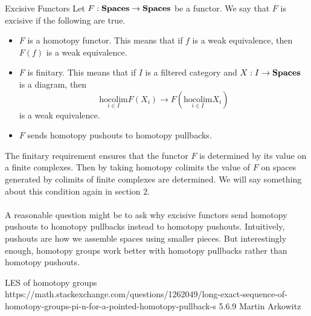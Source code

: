 \documentclass[a4paper]{article}
\begin{document}
\begin{defn}{Excisive Functors}{} Let $F:\bold{Spaces}\to\bold{Spaces}$ be a functor. We say that $F$ is excisive if the following are true. 
\begin{itemize}
\item $F$ is a homotopy functor. This means that if $f$ is a weak equivalence, then $F(f)$ is a weak equivalence. 
\item $F$ is finitary. This means that if $I$ is a filtered category and $X:I\to\bold{Spaces}$ is a diagram, then $$\underset{i\in I}{\text{hocolim}}F(X_i)\to F\left(\underset{i\in I}{\text{hocolim}}X_i\right)$$ is a weak equivalence. 
\item $F$ sends homotopy pushouts to homotopy pullbacks. 
\end{itemize}
\end{defn}

The finitary requirement ensures that the functor $F$ is determined by its value on a finite complexes. Then by taking homotopy colimits the value of $F$ on spaces generated by colimits of finite complexes are determined. We will say something about this condition again in section 2. \\~\\

A reasonable question might be to ask why excisive functors send homotopy pushouts to homotopy pullbacks instead to homotopy pushouts. Intuitively, pushouts are how we assemble spaces using smaller pieces. But interestingly enough, homotopy groups work better with homotopy pullbacks rather than homotopy pushouts. 

\begin{thm}{}{} LES of homotopy groups
https://math.stackexchange.com/questions/1262049/long-exact-sequence-of-homotopy-groups-pi-n-for-a-pointed-homotopy-pullback-s
5.6.9 Martin Arkowitz
\end{thm}
\end{document}
